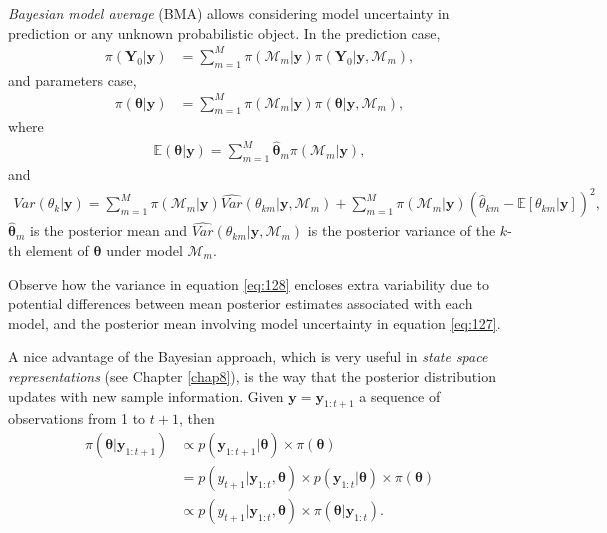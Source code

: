 \textit{Bayesian model average} (BMA) allows considering model uncertainty in prediction or any unknown probabilistic object. In the prediction case, 
\begin{align}
	\pi(\mathbf{Y}_0|\mathbf{y})&=\sum_{m=1}^M \pi(\mathcal{M}_m|\mathbf{y})\pi(\mathbf{Y}_0|\mathbf{y},\mathcal{M}_m),
\end{align}
and parameters case,
\begin{align}
	\pi(\bm{\theta}|\mathbf{y})&=\sum_{m=1}^M \pi(\mathcal{M}_m|\mathbf{y})\pi(\bm{\theta}|\mathbf{y},\mathcal{M}_m),
\end{align}
where 
\begin{align}
	\mathbb{E}(\bm{\theta}|\mathbf{y})=\sum_{m=1}^{M}\hat{\bm{\theta}}_m \pi(\mathcal{M}_m|\mathbf{y}),
	\label{eq:127}
\end{align}
and
\begin{align}
	Var({\theta}_k|\mathbf{y})= \sum_{m=1}^{M}\pi(\mathcal{M}_m|\mathbf{y}) \widehat{Var} ({\theta}_{km}|\mathbf{y},\mathcal{M}_m)+\sum_{m=1}^{M} \pi(\mathcal{M}_m|\mathbf{y}) (\hat{{\theta}}_{km}-\mathbb{E}[{\theta}_{km}|\mathbf{y}])^2,
	\label{eq:128}
\end{align}
$\hat{\bm{\theta}}_m$ is the posterior mean and $\widehat{Var}({\theta}_{km}|\mathbf{y},\mathcal{M}_m)$ is the posterior variance of the $k$-th element of $\bm{\theta}$ under model $\mathcal{M}_m$.

Observe how the variance in equation \ref{eq:128} encloses extra variability due to potential differences between mean posterior estimates associated with each model, and the posterior mean involving model uncertainty in equation \ref{eq:127}.

A nice advantage of the Bayesian approach, which is very useful in \textit{state space representations} (see Chapter \ref{chap8}), is the way that the posterior distribution updates with new sample information. Given $\mathbf{y}=\mathbf{y}_{1:t+1}$ a sequence of observations from 1 to $t+1$, then
\begin{align}\label{equpdate}
	\pi(\bm{\theta}|\mathbf{y}_{1:t+1})&\propto p(\mathbf{y}_{1:t+1}|\bm{\theta})\times \pi(\bm{\theta})\nonumber\\
	&= p(y_{t+1}|\mathbf{y}_{1:t},\bm{\theta})\times p(\mathbf{y}_{1:t}|\bm{\theta})\times \pi(\bm{\theta})\nonumber\\
	&\propto p(y_{t+1}|\mathbf{y}_{1:t},\bm{\theta})\times \pi(\bm{\theta}|\mathbf{y}_{1:t}). 
\end{align}

